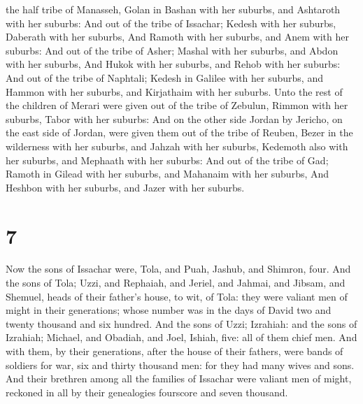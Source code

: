 the half tribe of Manasseh, Golan in Bashan with her suburbs, and
Ashtaroth with her suburbs:  And out of the tribe of
Issachar; Kedesh with her suburbs, Daberath with her suburbs,
 And Ramoth with her suburbs, and Anem with her suburbs:
 And out of the tribe of Asher; Mashal with her suburbs,
and Abdon with her suburbs,  And Hukok with her suburbs,
and Rehob with her suburbs:  And out of the tribe of
Naphtali; Kedesh in Galilee with her suburbs, and Hammon with her
suburbs, and Kirjathaim with her suburbs.  Unto the rest
of the children of Merari were given out of the tribe of Zebulun, Rimmon
with her suburbs, Tabor with her suburbs:  And on the
other side Jordan by Jericho, on the east side of Jordan, were given
them out of the tribe of Reuben, Bezer in the wilderness with her
suburbs, and Jahzah with her suburbs,  Kedemoth also with
her suburbs, and Mephaath with her suburbs:  And out of
the tribe of Gad; Ramoth in Gilead with her suburbs, and Mahanaim with
her suburbs,  And Heshbon with her suburbs, and Jazer
with her suburbs.

\hypertarget{section-6}{%
\section{7}\label{section-6}}

 Now the sons of Issachar were, Tola, and Puah, Jashub,
and Shimron, four.  And the sons of Tola; Uzzi, and
Rephaiah, and Jeriel, and Jahmai, and Jibsam, and Shemuel, heads of
their father's house, to wit, of Tola: they were valiant men of might in
their generations; whose number was in the days of David two and twenty
thousand and six hundred.  And the sons of Uzzi; Izrahiah:
and the sons of Izrahiah; Michael, and Obadiah, and Joel, Ishiah, five:
all of them chief men.  And with them, by their
generations, after the house of their fathers, were bands of soldiers
for war, six and thirty thousand men: for they had many wives and sons.
 And their brethren among all the families of Issachar
were valiant men of might, reckoned in all by their genealogies
fourscore and seven thousand.

